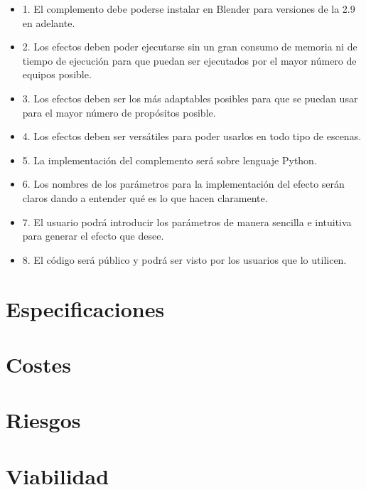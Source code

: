 \begin{itemize}[label={}]
	\item 1. El complemento debe poderse instalar en Blender para versiones de la 2.9 en adelante. 
	\item 2. Los efectos deben poder ejecutarse sin un gran consumo de memoria ni de tiempo de ejecución para que puedan ser ejecutados por el mayor número de equipos posible.
	\item 3. Los efectos deben ser los más adaptables posibles para que se puedan usar para el mayor número de propósitos posible.
	\item 4. Los efectos deben ser versátiles para poder usarlos en todo tipo de escenas.
	\item 5. La implementación del complemento será sobre lenguaje Python.
	\item 6. Los nombres de los parámetros para la implementación del efecto serán claros dando a entender qué es lo que hacen claramente.
	\item 7. El usuario podrá introducir los parámetros de manera sencilla e intuitiva para generar el efecto que desee.
	\item 8. El código será público y podrá ser visto por los usuarios que lo utilicen.
\end{itemize}

\newpage

\section{Especificaciones}

\section{Costes}

\section{Riesgos}

\section{Viabilidad}
